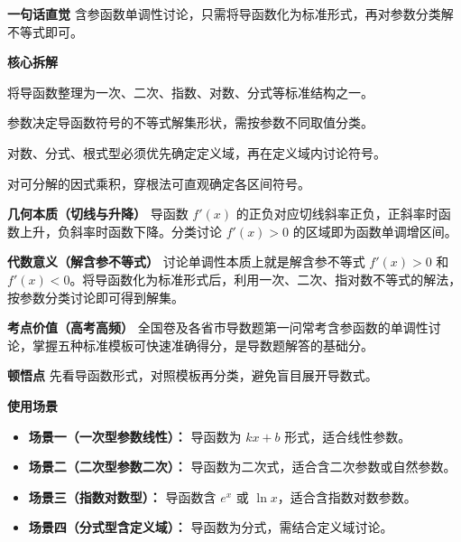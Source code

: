 \begin{explanationbox}
	\textbf{\textcolor{CExplanation}{一句话直觉}}
	含参函数单调性讨论，只需将导函数化为标准形式，再对参数分类解不等式即可。

	\medskip
	\textbf{\textcolor{CExplanation}{核心拆解}}
	\begin{description}[style=nextline, leftmargin=2.8em, labelsep=0.5em, itemsep=0.45em]
		\item[\textbf{要点一（标准形式识别）：}]
			将导函数整理为一次、二次、指数、对数、分式等标准结构之一。
		\item[\textbf{要点二（参数主导符号）：}]
			参数决定导函数符号的不等式解集形状，需按参数不同取值分类。
		\item[\textbf{要点三（定义域前提）：}]
			对数、分式、根式型必须优先确定定义域，再在定义域内讨论符号。
		\item[\textbf{要点四（穿根法应用）：}]
			对可分解的因式乘积，穿根法可直观确定各区间符号。
	\end{description}

	\medskip
	\textbf{\textcolor{CExplanation}{几何本质（切线与升降）}}
	导函数 $f'(x)$ 的正负对应切线斜率正负，正斜率时函数上升，负斜率时函数下降。分类讨论 $f'(x)>0$ 的区域即为函数单调增区间。

	\medskip
	\textbf{\textcolor{CExplanation}{代数意义（解含参不等式）}}
	讨论单调性本质上就是解含参不等式 $f'(x)>0$ 和 $f'(x)<0$。将导函数化为标准形式后，利用一次、二次、指对数不等式的解法，按参数分类讨论即可得到解集。

	\medskip
	\textbf{\textcolor{CExplanation}{考点价值（高考高频）}}
	全国卷及各省市导数题第一问常考含参函数的单调性讨论，掌握五种标准模板可快速准确得分，是导数题解答的基础分。

	\medskip
	\textbf{\textcolor{CExplanation}{顿悟点}}
	先看导函数形式，对照模板再分类，避免盲目展开导数式。

	\medskip
	\textbf{\textcolor{CExplanation}{使用场景}}
	\begin{itemize}[itemsep=0.5em, topsep=0.4em]
		\item \textbf{场景一（一次型参数线性）：} 导函数为 $kx+b$ 形式，适合线性参数。
		\item \textbf{场景二（二次型参数二次）：} 导函数为二次式，适合含二次参数或自然参数。
		\item \textbf{场景三（指数对数型）：} 导函数含 $e^x$ 或 $\ln x$，适合含指数对数参数。
		\item \textbf{场景四（分式型含定义域）：} 导函数为分式，需结合定义域讨论。
	\end{itemize}

\end{explanationbox}
